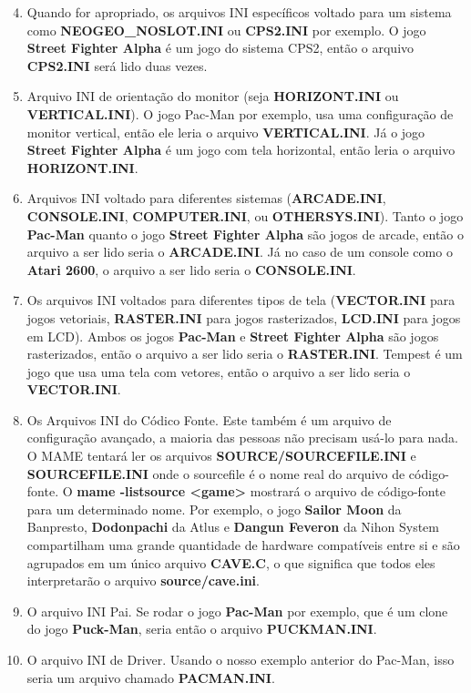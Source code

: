 \documentclass[letterpaper,10pt,brazil]{sphinxmanual}
\begin{document}
\begin{enumerate}
\setcounter{enumi}{3}
\item {} 
Quando for apropriado, os arquivos INI específicos voltado para
um sistema como \textbf{NEOGEO\_NOSLOT.INI} ou \textbf{CPS2.INI} por
exemplo.
O jogo \textbf{Street Fighter Alpha} é um jogo do sistema CPS2, então
o arquivo \textbf{CPS2.INI} será lido duas vezes.

\item {} 
Arquivo INI de orientação do monitor (seja \textbf{HORIZONT.INI} ou
\textbf{VERTICAL.INI}).
O jogo Pac-Man por exemplo, usa uma configuração de monitor
vertical, então ele leria o arquivo \textbf{VERTICAL.INI}.
Já o jogo \textbf{Street Fighter Alpha} é um jogo com tela
horizontal, então leria o arquivo \textbf{HORIZONT.INI}.

\item {} 
Arquivos INI voltado para diferentes sistemas (\textbf{ARCADE.INI},
\textbf{CONSOLE.INI}, \textbf{COMPUTER.INI}, ou \textbf{OTHERSYS.INI}).
Tanto o jogo \textbf{Pac-Man} quanto o jogo \textbf{Street Fighter Alpha}
são jogos de arcade, então o arquivo a ser lido seria o
\textbf{ARCADE.INI}.
Já no caso de um console como o \textbf{Atari 2600}, o arquivo a ser
lido seria o \textbf{CONSOLE.INI}.

\item {} 
Os arquivos INI voltados para diferentes tipos de tela
(\textbf{VECTOR.INI} para jogos vetoriais, \textbf{RASTER.INI} para jogos
rasterizados, \textbf{LCD.INI} para jogos em LCD).
Ambos os jogos \textbf{Pac-Man} e \textbf{Street Fighter Alpha} são jogos
rasterizados, então o arquivo a ser lido seria o \textbf{RASTER.INI}.
Tempest é um jogo que usa uma tela com vetores, então o arquivo
a ser lido seria o \textbf{VECTOR.INI}.

\item {} 
Os Arquivos INI do Códico Fonte.
Este também é um arquivo de configuração avançado, a maioria das
pessoas não precisam usá-lo para nada.
O MAME tentará ler os arquivos \textbf{SOURCE/SOURCEFILE.INI} e
\textbf{SOURCEFILE.INI} onde o sourcefile é o nome real do arquivo de
código-fonte.
O \textbf{mame -listsource \textless{}game\textgreater{}} mostrará o arquivo de código-fonte
para um determinado nome.
Por exemplo, o jogo \textbf{Sailor Moon} da Banpresto, \textbf{Dodonpachi}
da Atlus e \textbf{Dangun Feveron} da Nihon System compartilham uma
grande quantidade de hardware compatíveis entre si e são
agrupados em um único arquivo \textbf{CAVE.C}, o que significa que
todos eles interpretarão o arquivo \textbf{source/cave.ini}.

\item {} 
O arquivo INI Pai.
Se rodar o jogo \textbf{Pac-Man} por exemplo, que é um clone do jogo
\textbf{Puck-Man}, seria então o arquivo \textbf{PUCKMAN.INI}.

\item {} 
O arquivo INI de Driver.
Usando o nosso exemplo anterior do Pac-Man, isso seria um
arquivo chamado \textbf{PACMAN.INI}.

\end{enumerate}
\end{document}
